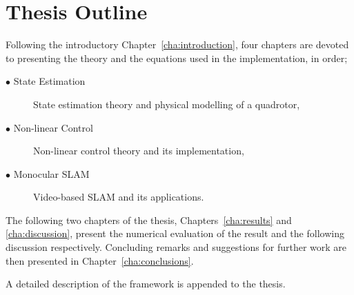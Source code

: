 \section{Thesis Outline}
    Following the introductory Chapter~\ref{cha:introduction}, four chapters
    are devoted to presenting the theory and the equations used in the implementation, in order;
    \begin{description}
        \item[$\bullet$ State Estimation] State estimation theory and physical modelling of a quadrotor,
        \item[$\bullet$ Non-linear Control]  Non-linear control theory and its implementation,
        \item[$\bullet$ Monocular SLAM] Video-based SLAM and its applications.
    \end{description}

    The following two chapters of the thesis, Chapters~\ref{cha:results} and \ref{cha:discussion}, present the
    numerical evaluation of the result and the following discussion respectively.
    Concluding remarks and suggestions for further work are then presented in Chapter~\ref{cha:conclusions}.

    A detailed description of the \crap framework is appended to the thesis.
